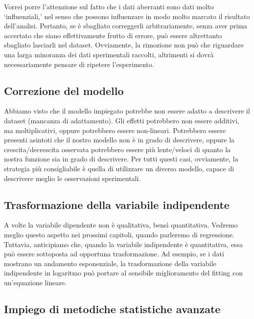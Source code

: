 \documentclass[a4paper,12pt,oneside]{book}
\begin{document}
Vorrei porre l'attenzione sul fatto che i dati aberranti sono dati molto `influenziali,' nel senso che possono influenzare in modo molto marcato il risultato dell'analisi. Pertanto, se è sbagliato correggerli arbitrariamente, senza aver prima accertato che siano effettivamente frutto di errore, può essere altrettanto sbagliato lasciarli nel dataset. Ovviamente, la rimozione non può che riguardare una larga minoranza dei dati sperimentali raccolti, altrimenti si dovrà necessariamente pensare di ripetere l'esperimento.

\hypertarget{correzione-del-modello}{%
\subsection{Correzione del modello}\label{correzione-del-modello}}

Abbiamo visto che il modello impiegato potrebbe non essere adatto a descrivere il dataset (mancanza di adattamento). Gli effetti potrebbero non essere additivi, ma moltiplicativi, oppure potrebbero essere non-lineari. Potrebbero essere presenti asintoti che il nostro modello non è in grado di descrivere, oppure la crescita/decrescita osservata potrebbero essere più lente/veloci di quanto la nostra funzione sia in grado di descrivere. Per tutti questi casi, ovviamente, la strategia più consigliabile è quella di utilizzare un diverso modello, capace di descrivere meglio le osservazioni sperimentali.

\hypertarget{trasformazione-della-variabile-indipendente}{%
\subsection{Trasformazione della variabile indipendente}\label{trasformazione-della-variabile-indipendente}}

A volte la variabile dipendente non è qualitativa, bensì quantitativa. Vedremo meglio questo aspetto nei prossimi capitoli, quando parleremo di regressione. Tuttavia, anticipiamo che, quando la variabile indipendente è quantitativa, essa può essere sottoposta ad opportuna trasformazione. Ad esempio, se i dati mostrano un andamento esponenziale, la trasformazione della variabile indipendente in logaritmo può portare al sensibile miglioramento del fitting con un'equazione lineare.

\hypertarget{impiego-di-metodiche-statistiche-avanzate}{%
\subsection{Impiego di metodiche statistiche avanzate}\label{impiego-di-metodiche-statistiche-avanzate}}
\end{document}
